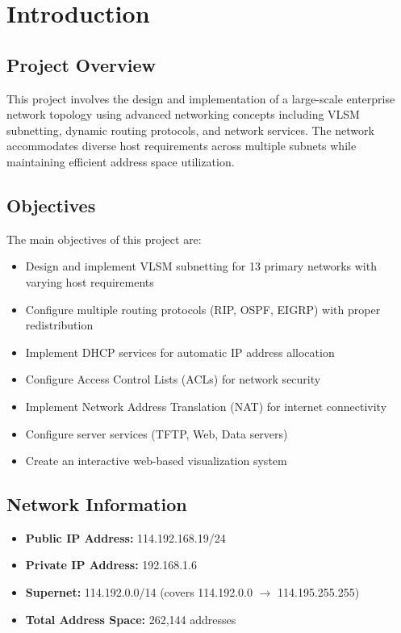 \documentclass[12pt,a4paper]{report}
\begin{document}
\newpage

\chapter{Introduction}

\section{Project Overview}

This project involves the design and implementation of a large-scale enterprise network topology using advanced networking concepts including VLSM subnetting, dynamic routing protocols, and network services. The network accommodates diverse host requirements across multiple subnets while maintaining efficient address space utilization.

\section{Objectives}

The main objectives of this project are:

\begin{itemize}
    \item Design and implement VLSM subnetting for 13 primary networks with varying host requirements
    \item Configure multiple routing protocols (RIP, OSPF, EIGRP) with proper redistribution
    \item Implement DHCP services for automatic IP address allocation
    \item Configure Access Control Lists (ACLs) for network security
    \item Implement Network Address Translation (NAT) for internet connectivity
    \item Configure server services (TFTP, Web, Data servers)
    \item Create an interactive web-based visualization system
\end{itemize}

\section{Network Information}

\begin{itemize}
    \item \textbf{Public IP Address:} 114.192.168.19/24
    \item \textbf{Private IP Address:} 192.168.1.6
    \item \textbf{Supernet:} 114.192.0.0/14 (covers 114.192.0.0 $\rightarrow$ 114.195.255.255)
    \item \textbf{Total Address Space:} 262,144 addresses
\end{itemize}
\end{document}

